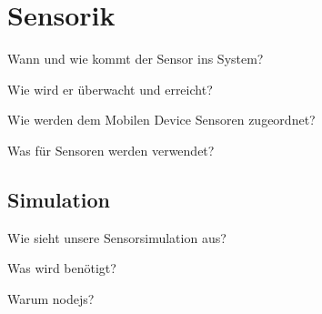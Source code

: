 \section{Sensorik}

Wann und wie kommt der Sensor ins System?

Wie wird er überwacht und erreicht?

Wie werden dem Mobilen Device Sensoren zugeordnet?

Was für Sensoren werden verwendet?


\subsection{Simulation}

Wie sieht unsere Sensorsimulation aus? 

Was wird benötigt? 

Warum nodejs?